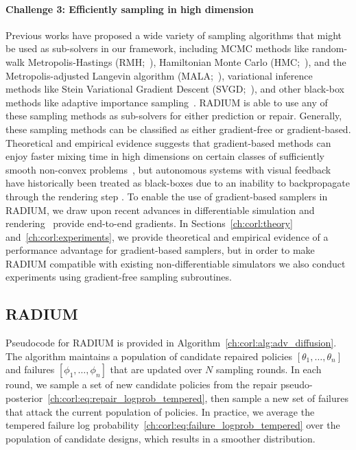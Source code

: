 \paragraph{Challenge 3: Efficiently sampling in high dimension}
%
Previous works have proposed a wide variety of sampling algorithms that might be used as sub-solvers in our framework, including MCMC methods like random-walk Metropolis-Hastings (RMH;~\cite{hastingsMonteCarloSampling1970}), Hamiltonian Monte Carlo (HMC;~\cite{nealMCMCUsingHamiltonian2011}), and the Metropolis-adjusted Langevin algorithm (MALA;~\cite{julianbresagCommentsGrenadierMiller1994}), variational inference methods like Stein Variational Gradient Descent (SVGD;~\cite{liuSteinVariationalGradient2016a}), and other black-box methods like adaptive importance sampling~\cite{okellyScalableEndtoEndAutonomous2018}. RADIUM is able to use any of these sampling methods as sub-solvers for either prediction or repair. Generally, these sampling methods can be classified as either gradient-free or gradient-based. Theoretical and empirical evidence suggests that gradient-based methods can enjoy faster mixing time in high dimensions on certain classes of sufficiently smooth non-convex problems~\cite{maSamplingCanBe2019}, but autonomous systems with visual feedback have historically  been treated as black-boxes due to an inability to backpropagate through the rendering step \cite{zhouRoCUSRobotController2021,okellyScalableEndtoEndAutonomous2018,sinhaNeuralBridgeSampling2020}.
%
To enable the use of gradient-based samplers in RADIUM, we draw upon recent advances in differentiable simulation and rendering~\cite{huDiffTaichiDifferentiableProgramming2019,lelidecDifferentiableRenderingPerturbed2021} provide end-to-end gradients. In Sections~\ref{ch:corl:theory} and~\ref{ch:corl:experiments}, we provide theoretical and empirical evidence of a performance advantage for gradient-based samplers, but in order to make RADIUM compatible with existing non-differentiable simulators we also conduct experiments using gradient-free sampling subroutines.

\subsection{RADIUM}

Pseudocode for RADIUM is provided in Algorithm~\ref{ch:corl:alg:adv_diffusion}. The algorithm maintains a population of candidate repaired policies $[\theta_1, \ldots, \theta_n]$ and failures $[\phi_1, \ldots, \phi_n]$ that are updated over $N$ sampling rounds. In each round, we sample a set of new candidate policies from the repair pseudo-posterior~\eqref{ch:corl:eq:repair_logprob_tempered}, then sample a new set of failures that attack the current population of policies. In practice, we average the tempered failure log probability~\eqref{ch:corl:eq:failure_logprob_tempered} over the population of candidate designs, which results in a smoother distribution.

